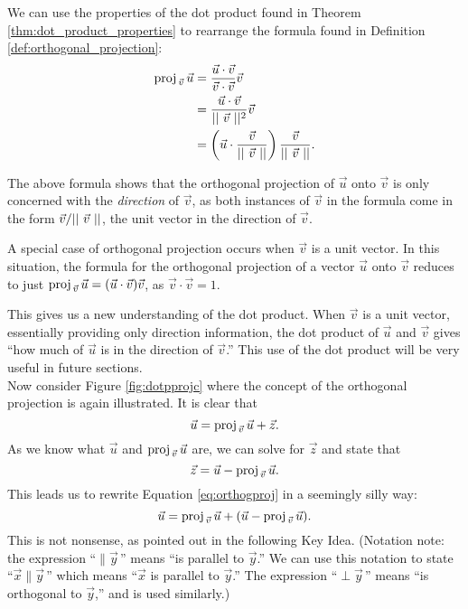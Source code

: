 We can use the properties of the dot product found in Theorem \ref{thm:dot_product_properties} to rearrange the formula found in Definition \ref{def:orthogonal_projection}:
\begin{align*}
\proj uv &= \frac{\dotp uv}{\dotp vv}\vec v\\
		&= \frac{\dotp uv}{\norm{\vec v}^2}\vec v\\
		&= \left(\vec u \cdot \frac{\vec v}{\norm{\vec v}}\right) \frac{\vec v}{\norm{\vec v}}.
\end{align*}

The above formula shows that the orthogonal projection of $\vec u$ onto $\vec v$ is only concerned with the \emph{direction} of $\vec v$, as both instances of $\vec v$ in the formula come in the form $\vec v/\norm{\vec v}$, the unit vector in the direction of $\vec v$.

A special case of orthogonal projection occurs when $\vec v$ is a unit vector. In this situation, the formula for the orthogonal projection of a vector $\vec u$ onto $\vec v$ reduces to just $\proj uv = (\vec u\cdot\vec v)\vec v$, as $\vec v\cdot\vec v = 1$.

This gives us a new understanding of the dot product. When $\vec v$ is a unit vector, essentially providing only direction information, the dot product of $\vec u$ and $\vec v$ gives ``how much of $\vec u$ is in the direction of $\vec v$.'' This use of the dot product will be very useful in future sections.\\

Now consider Figure \ref{fig:dotpprojc} where the concept of the orthogonal projection is again illustrated. It is clear that 
\begin{equation}
\vec u = \proj uv + \vec z.
\label{eq:orthogproj}
\end{equation} As we know what $\vec u$ and $\proj uv$ are, we can solve for $\vec z$ and state that
$$\vec z = \vec u - \proj uv.$$
This leads us to rewrite Equation \eqref{eq:orthogproj} in a seemingly silly way: $$\vec u = \proj uv + (\vec u - \proj uv).$$
This is not nonsense, as pointed out in the following Key Idea. (Notation note: the expression ``$\parallel \vec y$\,'' means ``is parallel to $\vec y$.'' We can use this notation to state ``$\vec x\parallel\vec y$\,'' which means ``$\vec x$ is parallel to $\vec y$.'' The expression ``$\perp \vec y$\,'' means ``is orthogonal to $\vec y$,'' and is used similarly.)

